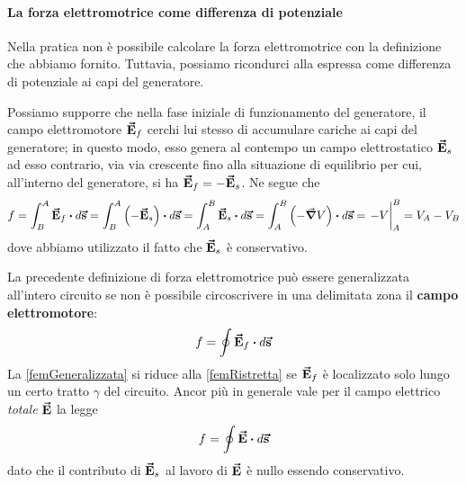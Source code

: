 \paragraph{La forza elettromotrice come differenza di potenziale}
Nella pratica non è possibile calcolare la forza elettromotrice con la definizione che abbiamo fornito. Tuttavia, possiamo ricondurci alla \fem espressa come differenza di potenziale ai capi del generatore.

Possiamo supporre che nella fase iniziale di funzionamento del generatore, il campo elettromotore $\vb*{\va{E}}_f$ cerchi lui stesso di accumulare cariche ai capi del generatore; in questo modo, esso genera al contempo un campo elettrostatico $\vb*{\va{E}}_s$ ad esso contrario, via via crescente fino alla situazione di equilibrio per cui, all'interno del generatore, si ha $\vb*{\va{E}}_f=-\vb*{\va{E}}_s$. Ne segue che
\begin{equation*}
	f=\int_{B}^{A}\vba{E}_f\vdot d\vba{s}=\int_{B}^{A}\left(-\vba{E}_s\right)\vdot d\vba{s}=\int_A^B\vba{E}_s\vdot d\vba{s}=\int_A^B\left(-\grad{V}\right)\vdot d\vba{s}=\eval{-V}_A^B=V_A-V_B
\end{equation*}
dove abbiamo utilizzato il fatto che $\vb*{\va{E}}_s$ è conservativo.

La precedente definizione di forza elettromotrice può essere generalizzata all'intero circuito se non è possibile circoscrivere in una delimitata zona il \textbf{campo elettromotore}:
\begin{equation}
	f=\oint \vba{E}_f\vdot d\vba{s}\label{femGeneralizzata}
\end{equation}
La \eqref{femGeneralizzata} si riduce alla \eqref{femRistretta} se $\vb*{\va{E}}_f$ è localizzato solo lungo un certo tratto $\gamma$ del circuito. Ancor più in generale vale per il campo elettrico \textit{totale} $\vb*{\va{E}}$ la legge
\begin{equation}
	f=\oint \vba{E}\vdot d\vba{s}
\end{equation}
dato che il contributo di $\vb*{\va{E}}_s$ al lavoro di $\vb*{\va{E}}$ è nullo essendo conservativo.
